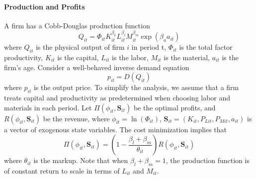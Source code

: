 \documentclass[11pt]{article}
\begin{document}
\paragraph{Production and Profits} A firm has a Cobb-Douglas production function
\begin{equation}
Q_{it} = \Phi_{it}K_{it}^{\beta_{k}}L_{it}^{\beta_l}M_{it}^{\beta_m}\exp{(\beta_a a_{it})}
\end{equation}
where $Q_{it}$ is the physical output of firm $i$ in period t, $\Phi_{it}$ is the total factor productivity, $K_{it}$ is the capital, $L_{it}$ is the labor, $M_{it}$ is the material, $a_{it}$ is the firm's age. Consider a well-behaved inverse demand equation
\begin{equation}
    p_{it} = D(Q_{it})
\end{equation}
where $p_{it}$ is the output price. To simplify the analysis, we assume that a firm treats capital and productivity as predetermined when choosing labor and materials in each period. Let $\Pi(\phi_{it},\mathbf{S}_{it})$ be the optimal profits, and $R(\phi_{it},\mathbf{S}_{it})$ be the revenue, where $\phi_{it}=\ln(\Phi_{it})$, $\mathbf{S}_{it}=(K_{it}, P_{Lit}, P_{Mit}, a_{it})$ is a vector of exogenous state variables. The cost minimization implies that
\begin{equation}
    \Pi(\phi_{it},\mathbf{S}_{it}) = (1-\frac{\beta_l+\beta_m}{\theta_{it}})R(\phi_{it},\mathbf{S}_{it})
\end{equation}
where $\theta_{it}$ is the markup. Note that when $\beta_l+\beta_m=1$, the production function is of constant return to scale in terms of $L_{it}$ and $M_{it}$.
\end{document}
